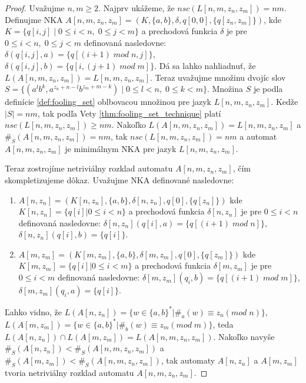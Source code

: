 \begin{proof}
Uvažujme $ n,m \geq 2 $. Najprv ukážeme, že $ nsc(L[n,m,z_n,z_m])=nm $. Definujme NKA $ A[n,m,z_n,z_m]=(K,\lbrace a,b \rbrace,\delta,q[0,0],\lbrace q[z_n,z_m] \rbrace) $, kde $ K = \lbrace q[i,j] \; | \; 0 \leq i < n, \; 0 \leq j < m \rbrace $ a prechodová funkcia $ \delta $ je pre $ 0 \leq i < n, \; 0 \leq j < m $ definovaná nasledovne: $ \delta(q[i,j],a) = \lbrace q[(i+1) \; mod \; n,j] \rbrace $, $ \delta(q[i,j],b) = \lbrace q[i, (j+1) \; mod \; m] \rbrace $. Dá sa lahko nahliadnuť, že $ L(A[n,m,z_n,z_m])=L[n,m,z_n,z_m] $. Teraz uvažujme množinu dvojíc slov $ S = \lbrace (a^lb^k, a^{z_n+n-l}b^{z_m+m-k}) \; | \; 0 \leq l < n, \; 0 \leq k < m \rbrace $. Množina $ S $ je podla definície \ref{def:fooling_set} oblbovacou množinou pre jazyk $ L[n,m,z_n,z_m] $. Kedže $ |S|=nm $, tak podľa Vety \ref{thm:fooling_set_technique} platí $ nsc(L[n,m,z_n,z_m]) \geq nm $. Nakoľko $ L(A[n,m,z_n,z_m])=L[n,m,z_n,z_m] $ a $ \#_S(A[n,m,z_n,z_m])=nm $, tak $ nsc(L[n,m,z_n,z_m])=nm $ a automat $ A[n,m,z_n,z_m] $ je minimálnym NKA pre jazyk $ L[n,m,z_n,z_m] $.
\par
Teraz zostrojíme netriviálny rozklad automatu $ A[n,m,z_n,z_m] $, čím skompletizujeme dôkaz. Uvažujme NKA definované nasledovne:
\begin{enumerate}  
\item $ A[n,z_n] = (K[n,z_n],\lbrace a,b \rbrace,\delta[n,z_n],q[0],\lbrace q[z_n] \rbrace)$ kde $ K[n,z_n] = \lbrace q[i] | 0 \leq i < n\rbrace $ a prechodová funkcia $ \delta[n,z_n] $ je pre $ 0 \leq i < n $ definovaná nasledovne: $ \delta[n,z_n](q[i],a) = \lbrace q[(i+1) \; mod \; n] \rbrace $, $ \delta[n,z_n](q[i],b) = \lbrace q[i] \rbrace $.
\item $ A[m,z_m] = (K[m,z_m],\lbrace a,b \rbrace,\delta[m,z_m],q[0],\lbrace q[z_m] \rbrace)$ kde $ K[m,z_m] = \lbrace q[i] | 0 \leq i < m \rbrace $ a prechodová funkcia $ \delta[m,z_m] $ je pre $ 0 \leq i < m $ definovaná nasledovne: $ \delta[m,z_m](q_i,b) = \lbrace q[(i+1) \; mod \; m] \rbrace $, $ \delta[m,z_m](q_i,a) = \lbrace q[i] \rbrace $.
\end{enumerate}
Ľahko vidno, že $ L(A[n,z_n]) = \lbrace w \in \lbrace a,b \rbrace^{*} | \#_a(w) \equiv z_n (mod \; n) \rbrace$, $ L(A[m,z_m]) = \lbrace w \in \lbrace a,b \rbrace^{*} | \#_b(w) \equiv z_m (mod \; m) \rbrace $, teda $ L(A[n,z_n]) \cap L(A[m,z_m]) = L(A[n,m,z_n,z_m]) $. Nakoľko navyše $ \#_S(A[n,z_n]) < \#_S(A[n,m,z_n,z_m]) $ a $ \#_S(A[m,z_m]) < \#_S(A[n,m,z_n,z_m]) $, tak automaty $ A[n,z_n] $ a $ A[m,z_m] $ tvoria netriviálny rozklad automatu $ A[n,m,z_n,z_m] $.
\end{proof}

